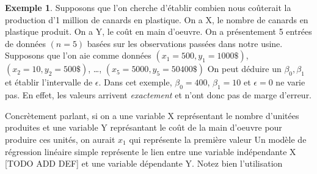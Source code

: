 \documentclass[12pt]{book}
\def\sep{\phantom{}}
\theoremstyle{definition}
\newtheorem*{example}{Exemple}
\begin{document}
\begin{example}
    Supposons que l'on cherche d'établir combien nous coûterait la production d'1 million de canards en plastique.
    On a X, le nombre de canards en plastique produit. \sep
    On a Y, le coût en main d'oeuvre. \sep
    On a présentement 5 entrées de données $(n=5)$ basées sur les observations passées dans notre usine. \sep
    Supposons que l'on aie comme données $(x_1 = 500, y_1 = 1000\$)$,$ (x_2 = 10, y_2 = 500\$)$, \dots, $(x_5 = 5000, y_5 = 50400\$)$ \sep 
    On peut déduire un $\beta_0, \beta_1 $ et établir l'intervalle de $\epsilon$. \sep
    Dans cet exemple, $\beta_0 = 400$, $\beta_1 = 10$ \sep 
    et $\epsilon = 0$ ne varie pas. En effet, les valeurs arrivent \textit{exactement} et n'ont donc pas de marge d'erreur.
\end{example}
Concrètement parlant, si on a une variable X représentant le nombre d'unitées produites et une variable Y représantant le coût de la main d'oeuvre pour produire ces unités,
on aurait $x_1$ qui représente la première valeur
Un modèle de régression linéaire simple représente le lien entre une variable indépendante X [TODO ADD DEF] et une variable dépendante Y.
Notez bien l'utilisation
\end{document}
